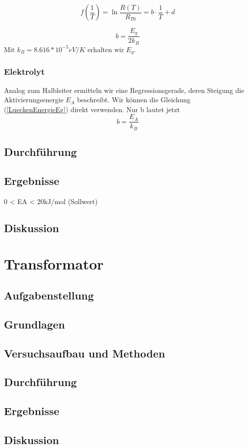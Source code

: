 \documentclass{article}
\begin{document}
\begin{equation}
\label{LueckenEnergieEg}
f(\frac{1}{T})=\ln\frac{R(T)}{R_{T0}}=b\cdot \frac{1}{T}+d
\end{equation}

\begin{equation}
\label{b-halbleiter}
b=\frac{E_g}{2k_B}
\end{equation}
Mit $k_{B}=8.616*10^{-5}eV/K$ erhalten wir $E_g$.

\subsubsection*{Elektrolyt}
Analog zum Halbleiter ermitteln wir eine Regressionsgerade, deren Steigung die Aktivierungsenergie $E_A$ beschreibt. Wir können die Gleichung (\ref{LueckenEnergieEg}) direkt verwenden. Nur b lautet jetzt
\begin{equation}
\label{b-elektrolyt}
b=\frac{E_A}{k_B}
\end{equation}

\subsection{Durchführung}
\subsection{Ergebnisse}
0 < EA < 20kJ/mol (Sollwert)
\subsection{Diskussion}

\section{Transformator}

\subsection{Aufgabenstellung}
\subsection{Grundlagen}
\subsection{Versuchsaufbau und Methoden}
\subsection{Durchführung}
\subsection{Ergebnisse}
\subsection{Diskussion}
\end{document}
